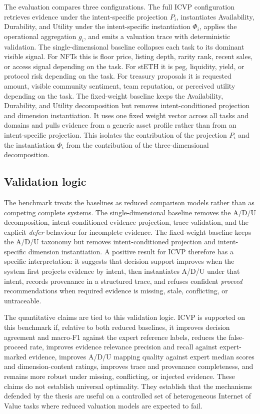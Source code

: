 The evaluation compares three configurations. The full ICVP configuration retrieves evidence under the intent-specific projection $P_i$, instantiates Availability, Durability, and Utility under the intent-specific instantiation $\Phi_i$, applies the operational aggregation $g_i$, and emits a valuation trace with deterministic validation. The single-dimensional baseline collapses each task to its dominant visible signal. For NFTs this is floor price, listing depth, rarity rank, recent sales, or access signal depending on the task. For stETH it is peg, liquidity, yield, or protocol risk depending on the task. For treasury proposals it is requested amount, visible community sentiment, team reputation, or perceived utility depending on the task. The fixed-weight baseline keeps the Availability, Durability, and Utility decomposition but removes intent-conditioned projection and dimension instantiation. It uses one fixed weight vector across all tasks and domains and pulls evidence from a generic asset profile rather than from an intent-specific projection. This isolates the contribution of the projection $P_i$ and the instantiation $\Phi_i$ from the contribution of the three-dimensional decomposition.

\subsection{Validation logic}

The benchmark treats the baselines as reduced comparison models rather than as competing complete systems. The single-dimensional baseline removes the A/D/U decomposition, intent-conditioned evidence projection, trace validation, and the explicit \textit{defer} behaviour for incomplete evidence. The fixed-weight baseline keeps the A/D/U taxonomy but removes intent-conditioned projection and intent-specific dimension instantiation. A positive result for ICVP therefore has a specific interpretation: it suggests that decision support improves when the system first projects evidence by intent, then instantiates A/D/U under that intent, records provenance in a structured trace, and refuses confident \textit{proceed} recommendations when required evidence is missing, stale, conflicting, or untraceable.

The quantitative claims are tied to this validation logic. ICVP is supported on this benchmark if, relative to both reduced baselines, it improves decision agreement and macro-F1 against the expert reference labels, reduces the false-proceed rate, improves evidence relevance precision and recall against expert-marked evidence, improves A/D/U mapping quality against expert median scores and dimension-content ratings, improves trace and provenance completeness, and remains more robust under missing, conflicting, or injected evidence. These claims do not establish universal optimality. They establish that the mechanisms defended by the thesis are useful on a controlled set of heterogeneous Internet of Value tasks where reduced valuation models are expected to fail.

